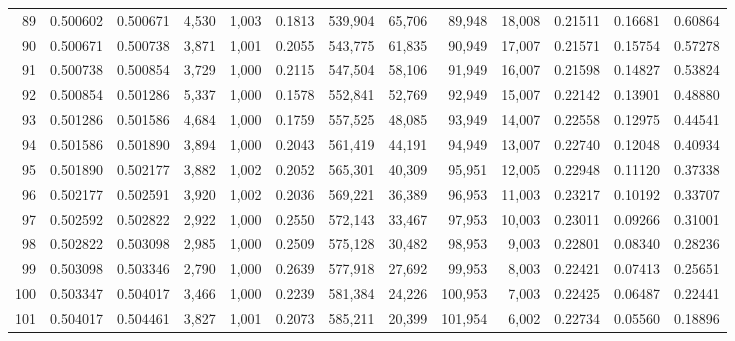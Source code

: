 \begin{tabular}{rrrrrrrrrrrrr}
89  &  0.500602 &  0.500671 &  4,530 &  1,003 &                                     0.1813 &  539,904 &   65,706 &   89,948 &   18,008 &  0.21511 &  0.16681 &  0.60864 \\
90  &  0.500671 &  0.500738 &  3,871 &  1,001 &                                     0.2055 &  543,775 &   61,835 &   90,949 &   17,007 &  0.21571 &  0.15754 &  0.57278 \\
91  &  0.500738 &  0.500854 &  3,729 &  1,000 &                                     0.2115 &  547,504 &   58,106 &   91,949 &   16,007 &  0.21598 &  0.14827 &  0.53824 \\
92  &  0.500854 &  0.501286 &  5,337 &  1,000 &                                     0.1578 &  552,841 &   52,769 &   92,949 &   15,007 &  0.22142 &  0.13901 &  0.48880 \\
93  &  0.501286 &  0.501586 &  4,684 &  1,000 &                                     0.1759 &  557,525 &   48,085 &   93,949 &   14,007 &  0.22558 &  0.12975 &  0.44541 \\
94  &  0.501586 &  0.501890 &  3,894 &  1,000 &                                     0.2043 &  561,419 &   44,191 &   94,949 &   13,007 &  0.22740 &  0.12048 &  0.40934 \\
95  &  0.501890 &  0.502177 &  3,882 &  1,002 &                                     0.2052 &  565,301 &   40,309 &   95,951 &   12,005 &  0.22948 &  0.11120 &  0.37338 \\
96  &  0.502177 &  0.502591 &  3,920 &  1,002 &                                     0.2036 &  569,221 &   36,389 &   96,953 &   11,003 &  0.23217 &  0.10192 &  0.33707 \\
97  &  0.502592 &  0.502822 &  2,922 &  1,000 &                                     0.2550 &  572,143 &   33,467 &   97,953 &   10,003 &  0.23011 &  0.09266 &  0.31001 \\
98  &  0.502822 &  0.503098 &  2,985 &  1,000 &                                     0.2509 &  575,128 &   30,482 &   98,953 &    9,003 &  0.22801 &  0.08340 &  0.28236 \\
99  &  0.503098 &  0.503346 &  2,790 &  1,000 &                                     0.2639 &  577,918 &   27,692 &   99,953 &    8,003 &  0.22421 &  0.07413 &  0.25651 \\
100 &  0.503347 &  0.504017 &  3,466 &  1,000 &                                     0.2239 &  581,384 &   24,226 &  100,953 &    7,003 &  0.22425 &  0.06487 &  0.22441 \\
101 &  0.504017 &  0.504461 &  3,827 &  1,001 &                                     0.2073 &  585,211 &   20,399 &  101,954 &    6,002 &  0.22734 &  0.05560 &  0.18896 \\

\end{tabular}
